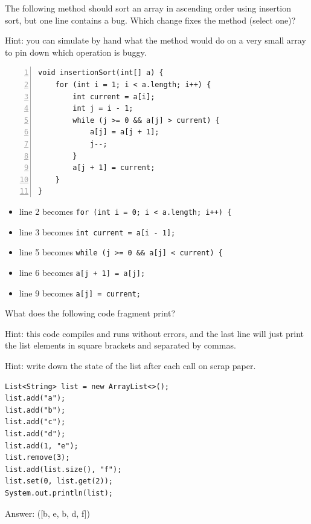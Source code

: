 \begin{question}
The following method should sort an array in ascending order using insertion sort, but one line contains a bug.
Which change fixes the method (select one)?

Hint: you can simulate by hand what the method would do on a very small array to pin down which operation is buggy.

\begin{lstlisting}[numbers=left,numberstyle=\tiny,xleftmargin=2em]
void insertionSort(int[] a) {
    for (int i = 1; i < a.length; i++) {
        int current = a[i];
        int j = i - 1;
        while (j >= 0 && a[j] > current) {
            a[j] = a[j + 1];
            j--;
        }
        a[j + 1] = current;
    }
}
\end{lstlisting}

\begin{itemize}[leftmargin=2em,itemsep=1pt,topsep=2pt]
\item[\cb{0}] line 2 becomes \lstinline|for (int i = 0; i < a.length; i++) {|
\item[\cb{0}] line 3 becomes \lstinline|int current = a[i - 1];|
\item[\cb{0}] line 5 becomes \lstinline|while (j >= 0 && a[j] < current) {|
\item[\cb{1}] line 6 becomes \lstinline|a[j + 1] = a[j];|
\item[\cb{0}] line 9 becomes \lstinline|a[j] = current;|
\end{itemize}
\end{question}

\begin{question}
What does the following code fragment print?

Hint: this code compiles and runs without errors, and the last line will just print the list elements in square brackets and separated by commas.

Hint: write down the state of the list after each call on scrap paper.

\begin{lstlisting}
List<String> list = new ArrayList<>();
list.add("a");
list.add("b");
list.add("c");
list.add("d");
list.add(1, "e");
list.remove(3);
list.add(list.size(), "f");
list.set(0, list.get(2));
System.out.println(list);
\end{lstlisting}

Answer: \underline{\hspace{2in}} \ifanswers ([b, e, b, d, f])\fi
\end{question}

